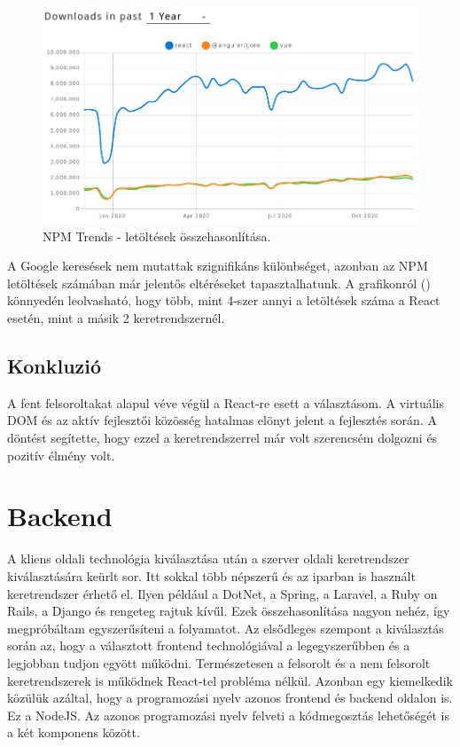 \begin{figure}[!ht]
  \centering
  \includegraphics[width=150mm, keepaspectratio]{figures/npm_trends.png}
  \caption{NPM Trends - letöltések összehasonlítása.}
  \label{fig:NPMTrends}
\end{figure}

A Google keresések nem mutattak szignifikáns különbséget, azonban az NPM letöltések számában már jelentős eltéréseket tapasztalhatunk. A grafikonról () könnyedén leolvasható, hogy több, mint 4-szer annyi a letöltések száma a React esetén, mint a másik 2 keretrendszernél.

\subsection{Konkluzió}
A fent felsoroltakat alapul véve végül a React-re esett a választásom. A virtuális DOM és az aktív fejlesztői közösség hatalmas elönyt jelent a fejlesztés során. A döntést segítette, hogy ezzel a keretrendszerrel már volt szerencsém dolgozni és pozitív élmény volt.

\section{Backend}

A kliens oldali technológia kiválasztása után a szerver oldali keretrendszer kiválasztására keürlt sor.
Itt sokkal több népszerű és az iparban is használt keretrendszer érhető el. Ilyen például a DotNet, a Spring, a Laravel, a Ruby on Rails, a Django és rengeteg rajtuk kívűl. Ezek összehasonlítása nagyon nehéz, így megpróbáltam egyszerűsíteni a folyamatot. Az elsődleges szempont a kiválasztás során az, hogy a választott frontend technológiával a legegyszerűbben és a legjobban tudjon egyött működni. Természetesen a felsorolt és a nem felsorolt keretrendszerek is működnek React-tel probléma nélkül. Azonban egy kiemelkedik közülük azáltal, hogy a programozási nyelv azonos frontend és backend oldalon is. Ez a NodeJS. Az azonos programozási nyelv felveti a kódmegosztás lehetőségét is a két komponens között. 


